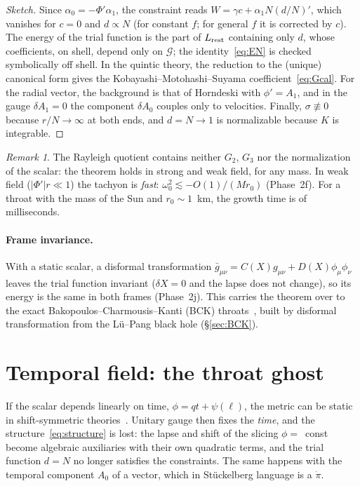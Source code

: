 \documentclass[11pt,a4paper]{article}
\theoremstyle{remark}
\newtheorem{remark}{Remark}
\newcommand{\G}{\mathcal G}
\begin{document}
\begin{proof}[Sketch]
Since $\alpha_0=-\Phi'\alpha_1$, the constraint reads $W=\gamma c+\alpha_1N(d/N)'$, which vanishes for $c=0$ and $d\propto N$ (for constant $f$; for general $f$ it is corrected by $c$). The energy of the trial function is the part of $L_{\rm rest}$ containing only $d$, whose coefficients, on shell, depend only on $\G$; the identity~\eqref{eq:EN} is checked symbolically off shell. In the quintic theory, the reduction to the (unique) canonical form gives the Kobayashi--Motohashi--Suyama coefficient~\eqref{eq:Gcal}. For the radial vector, the background is that of Horndeski with $\phi'=A_1$, and in the gauge $\delta A_1=0$ the component $\delta A_0$ couples only to velocities. Finally, $\sigma\not\equiv0$ because $r/N\to\infty$ at both ends, and $d=N\to1$ is normalizable because $K$ is integrable.
\end{proof}

\begin{remark}
The Rayleigh quotient contains neither $G_2$, $G_3$ nor the normalization of the scalar: the theorem holds in strong and weak field, for any mass. In weak field ($|\Phi'|r\ll1$) the tachyon is \emph{fast}: $\omega_0^2\lesssim-O(1)/(Mr_0)$ (Phase~2f). For a throat with the mass of the Sun and $r_0\sim1$~km, the growth time is of milliseconds.
\end{remark}

\paragraph{Frame invariance.} With a static scalar, a disformal transformation $\bar g_{\mu\nu}=C(X)g_{\mu\nu}+D(X)\phi_\mu\phi_\nu$ leaves the trial function invariant ($\delta X=0$ and the lapse does not change), so its energy is the same in both frames (Phase~2j). This carries the theorem over to the exact Bakopoulos--Charmousis--Kanti (BCK) throats~\cite{BCK}, built by disformal transformation from the Lü--Pang black hole (\S\ref{sec:BCK}).

\section{Temporal field: the throat ghost}\label{sec:temporal}

If the scalar depends linearly on time, $\phi=qt+\psi(\ell)$, the metric can be static in shift-symmetric theories~\cite{BabichevCharmousis}. Unitary gauge then fixes the \emph{time}, and the structure~\eqref{eq:structure} is lost: the lapse and shift of the slicing $\phi=$~const become algebraic auxiliaries with their own quadratic terms, and the trial function $d=N$ no longer satisfies the constraints. The same happens with the temporal component $A_0$ of a vector, which in Stückelberg language is a $\dot\pi$.
\end{document}
